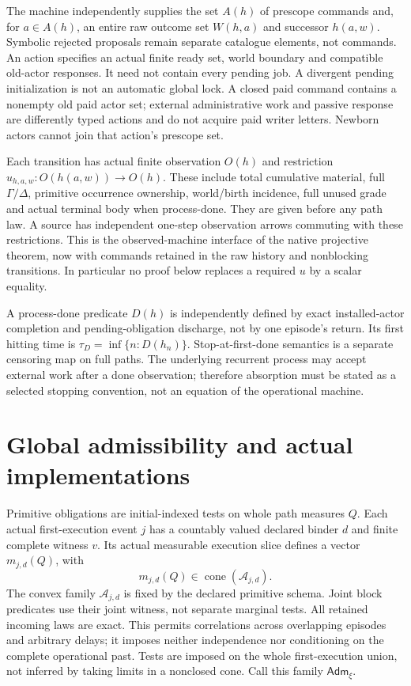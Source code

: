\documentclass{article}
\begin{document}
The machine independently supplies the set $A(h)$ of prescope commands and, for $a\in A(h)$, an entire raw outcome set $W(h,a)$ and successor $h(a,w)$. Symbolic rejected proposals remain separate catalogue elements, not commands. An action specifies an actual finite ready set, world boundary and compatible old-actor responses. It need not contain every pending job. A divergent pending initialization is not an automatic global lock. A closed paid command contains a nonempty old paid actor set; external administrative work and passive response are differently typed actions and do not acquire paid writer letters. Newborn actors cannot join that action's prescope set.

Each transition has actual finite observation $O(h)$ and restriction $u_{h,a,w}:O(h(a,w))\to O(h)$. These include total cumulative material, full $\Gamma/\Delta$, primitive occurrence ownership, world/birth incidence, full unused grade and actual terminal body when process-done. They are given before any path law. A source has independent one-step observation arrows commuting with these restrictions. This is the observed-machine interface of the native projective theorem, now with commands retained in the raw history and nonblocking transitions. In particular no proof below replaces a required $u$ by a scalar equality.

A process-done predicate $D(h)$ is independently defined by exact installed-actor completion and pending-obligation discharge, not by one episode's return. Its first hitting time is $\tau_D=\inf\{n:D(h_n)\}$. Stop-at-first-done semantics is a separate censoring map on full paths. The underlying recurrent process may accept external work after a done observation; therefore absorption must be stated as a selected stopping convention, not an equation of the operational machine.

\section{Global admissibility and actual implementations}
Primitive obligations are initial-indexed tests on whole path measures $Q$. Each actual first-execution event $j$ has a countably valued declared binder $d$ and finite complete witness $v$. Its actual measurable execution slice defines a vector $m_{j,d}(Q)$, with
\[
 m_{j,d}(Q)\in\operatorname{cone}(\mathcal A_{j,d}).\tag{1}
\]
The convex family $\mathcal A_{j,d}$ is fixed by the declared primitive schema. Joint block predicates use their joint witness, not separate marginal tests. All retained incoming laws are exact. This permits correlations across overlapping episodes and arbitrary delays; it imposes neither independence nor conditioning on the complete operational past. Tests are imposed on the whole first-execution union, not inferred by taking limits in a nonclosed cone. Call this family $\mathsf{Adm}_\xi$.
\end{document}
